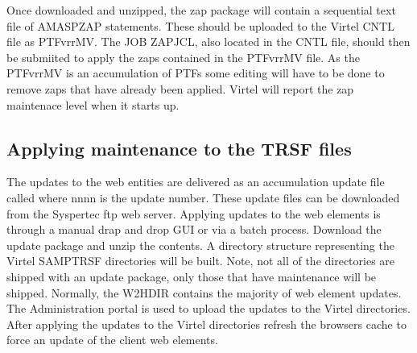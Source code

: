\documentclass[letterpaper,10pt,english]{sphinxmanual}
\begin{document}
\sphinxAtStartPar
{}

\sphinxAtStartPar
{}

\newpage

\sphinxAtStartPar
Once downloaded and unzipped, the zap package will contain a sequential text file of AMASPZAP statements. These should be uploaded to the Virtel CNTL file as PTFvrrMV. The JOB ZAPJCL, also located in the CNTL file, should then be submiited to apply the zaps contained in the PTFvrrMV file. As the PTFvrrMV is an accumulation of PTFs some editing will have to be done to remove zaps that have already been applied. Virtel will report the zap maintenace level when it starts up.

\begin{sphinxVerbatim}[commandchars=\\\{\}]
       
 
      
\end{sphinxVerbatim}

\ignorespaces 

\subsection{Applying maintenance to the TRSF files}
\label{\detokenize{audit_operations_ and_performance:applying-maintenance-to-the-trsf-files}}\label{\detokenize{audit_operations_ and_performance:index-46}}
\sphinxAtStartPar
The updates to the web entities are delivered as an accumulation update file called  where nnnn is the update number. These update files can be downloaded from the Syspertec ftp web server. Applying updates to the web elements is through a manual drap and drop GUI or via a batch process. Download the update package and unzip the contents. A directory structure representing the Virtel SAMPTRSF directories will be built. Note, not all of the directories are shipped with an update package, only those that have maintenance will be shipped. Normally, the W2H\sphinxhyphen{}DIR contains the majority of web element updates. The Administration portal is used to upload the updates to the Virtel directories. After applying the updates to the Virtel directories refresh the browsers cache to force an update of the client web elements.
\end{document}
